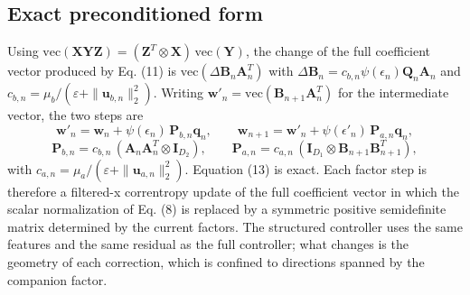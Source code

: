 \documentclass[preprint,12pt]{elsarticle}
\begin{document}
\subsection{Exact preconditioned form}
Using $\mathrm{vec}(\mathbf{X}\mathbf{Y}\mathbf{Z}) = (\mathbf{Z}^T \otimes \mathbf{X})\,\mathrm{vec}(\mathbf{Y})$, the change of the full coefficient vector produced by Eq. (11) is $\mathrm{vec}(\Delta\mathbf{B}_n \mathbf{A}_n^T)$ with $\Delta\mathbf{B}_n = c_{b,n}\psi(\epsilon_n)\mathbf{Q}_n\mathbf{A}_n$ and $c_{b,n} = \mu_b / (\varepsilon + \|\mathbf{u}_{b,n}\|_2^2)$. Writing $\mathbf{w}'_n = \mathrm{vec}(\mathbf{B}_{n+1}\mathbf{A}_n^T)$ for the intermediate vector, the two steps are
\begin{equation}
\mathbf{w}'_n = \mathbf{w}_n + \psi(\epsilon_n)\,\mathbf{P}_{b,n}\mathbf{q}_n, \qquad
\mathbf{w}_{n+1} = \mathbf{w}'_n + \psi(\epsilon'_n)\,\mathbf{P}_{a,n}\mathbf{q}_n, \tag{13}
\end{equation}
\begin{equation}
\mathbf{P}_{b,n} = c_{b,n}\,(\mathbf{A}_n\mathbf{A}_n^T \otimes \mathbf{I}_{D_2}), \qquad
\mathbf{P}_{a,n} = c_{a,n}\,(\mathbf{I}_{D_1} \otimes \mathbf{B}_{n+1}\mathbf{B}_{n+1}^T), \tag{14}
\end{equation}
with $c_{a,n} = \mu_a / (\varepsilon + \|\mathbf{u}_{a,n}\|_2^2)$. Equation (13) is exact. Each factor step is therefore a filtered-x correntropy update of the full coefficient vector in which the scalar normalization of Eq. (8) is replaced by a symmetric positive semidefinite matrix determined by the current factors. The structured controller uses the same features and the same residual as the full controller; what changes is the geometry of each correction, which is confined to directions spanned by the companion factor.
\end{document}

